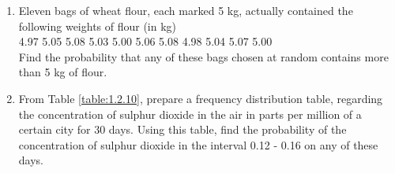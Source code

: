 \begin{enumerate}[label=\thesection.\arabic*.,ref=\thesection.\theenumi]
\item Eleven bags of wheat flour, each marked 5 kg, actually contained the following weights of flour (in kg)\\
4.97 5.05 5.08 5.03 5.00 5.06 5.08 4.98 5.04 5.07 5.00\\
Find the probability that any of these bags chosen at random contains more than 5 kg of flour.\\
\solution
%

\item From Table \ref{table:1.2.10}, 
prepare a frequency distribution table, regarding the concentration of sulphur dioxide in the air in parts per million of a certain city for 30 days.   Using this table, find the probability of the concentration of sulphur dioxide in the interval 0.12 - 0.16 on any of these days.
%
\begin{table}[!ht]
\centering
\begin{tabular}{ cccccc} 


\end{tabular}
\end{table}
\end{enumerate}
